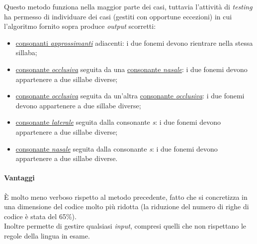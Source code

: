       Questo metodo funziona nella maggior parte dei casi, tuttavia l'attività di \textit{testing} ha permesso 
      di individuare dei casi (gestiti con opportune eccezioni)
      in cui l'algoritmo fornito sopra produce \textit{output} scorretti:
      \begin{itemize}
        \item {\hyperref[glo:consappr]{consonanti \emph{approssimanti}\glsfirstoccur}} adiacenti: 
              i due fonemi devono rientrare nella stessa sillaba;
              \label{exc:apprappr}
        \item {\hyperref[glo:consoccl]{consonante \emph{occlusiva}\glsfirstoccur}} seguita da una 
              {\hyperref[glo:consnasa]{consonante \emph{nasale}\glsfirstoccur}}: i due fonemi devono appartenere a due sillabe diverse;
              \label{exc:occlnasa}
        \item {\hyperref[glo:consoccl]{consonante \emph{occlusiva}\glsfirstoccur}} seguita da un'altra 
              {\hyperref[glo:consoccl]{consonante \emph{occlusiva}\glsfirstoccur}}: i due fonemi devono appartenere a due sillabe diverse;
              \label{exc:occloccl}
        \item {\hyperref[glo:conslate]{consonante \emph{laterale}\glsfirstoccur}} seguita dalla consonante \textit{s}: 
              i due fonemi devono appartenere a due sillabe diverse;
              \label{exc:lates}
        \item {\hyperref[glo:consnasa]{consonante \emph{nasale}\glsfirstoccur}} seguita dalla consonante \textit{s}: 
              i due fonemi devono appartenere a due sillabe diverse.
              \label{exc:nasas} 
      \end{itemize}

             \paragraph{Vantaggi}
                     È molto meno verboso rispetto al metodo precedente, fatto che si concretizza in una dimensione del codice molto
                     più ridotta (la riduzione del numero di righe di codice è stata del 65\%). \\ Inoltre permette di gestire 
                     qualsiasi \textit{input}, compresi
                     quelli che non rispettano le regole della lingua in esame.
